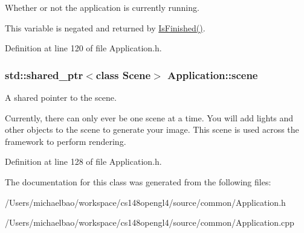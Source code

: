 Whether or not the application is currently running. 

This variable is negated and returned by \hyperlink{class_application_ae0019f2c58008791971e67f23f2d4182}{Is\+Finished()}. 

Definition at line 120 of file Application.\+h.

\hypertarget{class_application_a88c6615107a5094bb93fa5f153f79554}{}
\subsubsection[{scene}]{\setlength{\rightskip}{0pt plus 5cm}std\+::shared\+\_\+ptr$<$class {\bf Scene}$>$ Application\+::scene\hspace{0.3cm}{\ttfamily [protected]}}\label{class_application_a88c6615107a5094bb93fa5f153f79554}


A shared pointer to the scene. 

Currently, there can only ever be one scene at a time. You will add lights and other objects to the scene to generate your image. This scene is used across the framework to perform rendering. 

Definition at line 128 of file Application.\+h.



The documentation for this class was generated from the following files\+:\begin{DoxyCompactItemize}
\item 
/\+Users/michaelbao/workspace/cs148opengl4/source/common/Application.\+h\item 
/\+Users/michaelbao/workspace/cs148opengl4/source/common/Application.\+cpp\end{DoxyCompactItemize}
